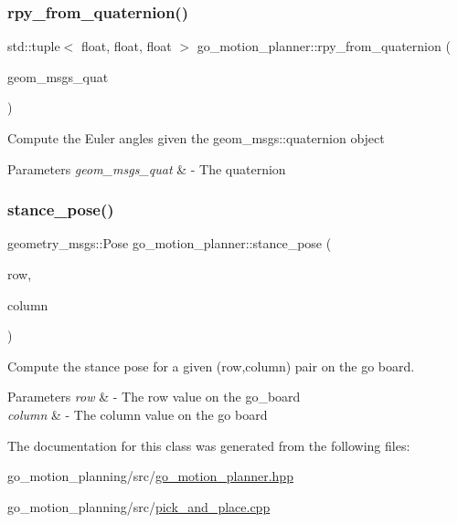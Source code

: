 \subsubsection{\texorpdfstring{rpy\+\_\+from\+\_\+quaternion()}{rpy\_from\_quaternion()}}
{\footnotesize\ttfamily std\+::tuple$<$ float, float, float $>$ go\+\_\+motion\+\_\+planner\+::rpy\+\_\+from\+\_\+quaternion (\begin{DoxyParamCaption}\item[{geometry\+\_\+msgs\+::\+Quaternion}]{geom\+\_\+msgs\+\_\+quat }\end{DoxyParamCaption})}




\begin{DoxyItemize}
\item Compute the Euler angles given the geom\+\_\+msgs\+::quaternion object 
\end{DoxyItemize}


\begin{DoxyParams}{Parameters}
{\em geom\+\_\+msgs\+\_\+quat} & -\/ The quaternion \\
\hline
\end{DoxyParams}
\mbox{\label{classgo__motion__planner_a2120e26233b9622d9af923f7649b73fe}} 
\subsubsection{\texorpdfstring{stance\+\_\+pose()}{stance\_pose()}}
{\footnotesize\ttfamily geometry\+\_\+msgs\+::\+Pose go\+\_\+motion\+\_\+planner\+::stance\+\_\+pose (\begin{DoxyParamCaption}\item[{int}]{row,  }\item[{int}]{column }\end{DoxyParamCaption})}



Compute the stance pose for a given (row,column) pair on the go board. 


\begin{DoxyParams}{Parameters}
{\em row} & -\/ The row value on the go\+\_\+board \\
\hline
{\em column} & -\/ The column value on the go board \\
\hline
\end{DoxyParams}


The documentation for this class was generated from the following files\+:\begin{DoxyCompactItemize}
\item 
go\+\_\+motion\+\_\+planning/src/\hyperlink{go__motion__planner_8hpp}{go\+\_\+motion\+\_\+planner.\+hpp}\item 
go\+\_\+motion\+\_\+planning/src/\hyperlink{pick__and__place_8cpp}{pick\+\_\+and\+\_\+place.\+cpp}\end{DoxyCompactItemize}

